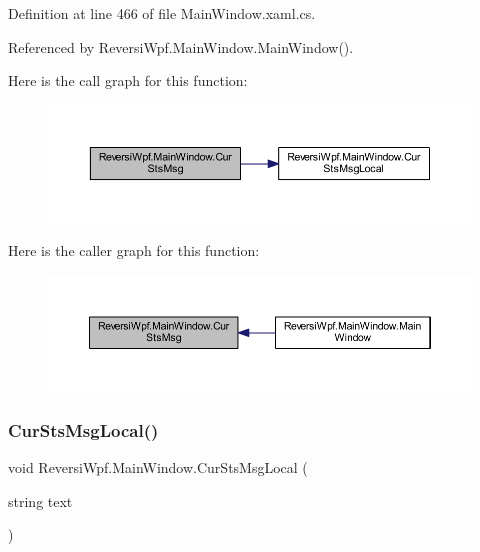 Definition at line 466 of file Main\+Window.\+xaml.\+cs.



Referenced by Reversi\+Wpf.\+Main\+Window.\+Main\+Window().

Here is the call graph for this function\+:\nopagebreak
\begin{figure}[H]
\begin{center}
\leavevmode
\includegraphics[width=350pt]{class_reversi_wpf_1_1_main_window_a90e6aa75849526159fe9348da2b66fb0_cgraph}
\end{center}
\end{figure}
Here is the caller graph for this function\+:\nopagebreak
\begin{figure}[H]
\begin{center}
\leavevmode
\includegraphics[width=350pt]{class_reversi_wpf_1_1_main_window_a90e6aa75849526159fe9348da2b66fb0_icgraph}
\end{center}
\end{figure}
\mbox{\label{class_reversi_wpf_1_1_main_window_a73402ffecf2de584339327dce357bd60}} 
\subsubsection{\texorpdfstring{Cur\+Sts\+Msg\+Local()}{CurStsMsgLocal()}}
{\footnotesize\ttfamily void Reversi\+Wpf.\+Main\+Window.\+Cur\+Sts\+Msg\+Local (\begin{DoxyParamCaption}\item[{string}]{text }\end{DoxyParamCaption})}



